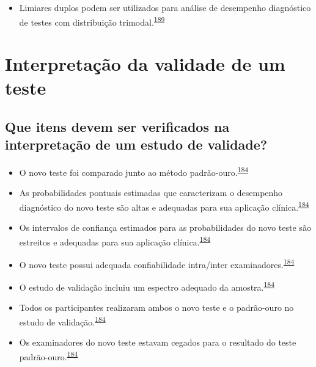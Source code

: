 \documentclass[
  a4paper,
]{book}
\providecommand{\tightlist}{%
  \setlength{\itemsep}{0pt}\setlength{\parskip}{0pt}}
\begin{document}
\begin{itemize}
\tightlist
\item
  Limiares duplos podem ser utilizados para análise de desempenho diagnóstico de testes com distribuição trimodal.\textsuperscript{\protect\hyperlink{ref-ferreira2021}{189}}
\end{itemize}

\hypertarget{interpretacao-desempenho}{%
\section{Interpretação da validade de um teste}\label{interpretacao-desempenho}}

\hypertarget{que-itens-devem-ser-verificados-na-interpretauxe7uxe3o-de-um-estudo-de-validade}{%
\subsection{Que itens devem ser verificados na interpretação de um estudo de validade?}\label{que-itens-devem-ser-verificados-na-interpretauxe7uxe3o-de-um-estudo-de-validade}}

\begin{itemize}
\item
  O novo teste foi comparado junto ao método padrão-ouro.\textsuperscript{\protect\hyperlink{ref-greenhalgh1997b}{184}}
\item
  As probabilidades pontuais estimadas que caracterizam o desempenho diagnóstico do novo teste são altas e adequadas para sua aplicação clínica.\textsuperscript{\protect\hyperlink{ref-greenhalgh1997b}{184}}
\item
  Os intervalos de confiança estimados para as probabilidades do novo teste são estreitos e adequadas para sua aplicação clínica.\textsuperscript{\protect\hyperlink{ref-greenhalgh1997b}{184}}
\item
  O novo teste possui adequada confiabilidade intra/inter examinadores.\textsuperscript{\protect\hyperlink{ref-greenhalgh1997b}{184}}
\item
  O estudo de validação incluiu um espectro adequado da amostra.\textsuperscript{\protect\hyperlink{ref-greenhalgh1997b}{184}}
\item
  Todos os participantes realizaram ambos o novo teste e o padrão-ouro no estudo de validação.\textsuperscript{\protect\hyperlink{ref-greenhalgh1997b}{184}}
\item
  Os examinadores do novo teste estavam cegados para o resultado do teste padrão-ouro.\textsuperscript{\protect\hyperlink{ref-greenhalgh1997b}{184}}
\end{itemize}
\end{document}
